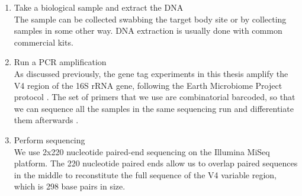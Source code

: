 \begin{enumerate}
\item Take a biological sample and extract the DNA\\
The sample can be collected swabbing the target body site or by collecting samples in some other way. DNA extraction is usually done with common commercial kits.

\item Run a PCR amplification\\
As discussed previously, the gene tag experiments in this thesis amplify the V4 region of the 16S rRNA gene, following the Earth Microbiome Project protocol \cite{caporaso2012ultra}. The set of primers that we use are combinatorial barcoded, so that we can sequence all the samples in the same sequencing run and differentiate them afterwards \cite{gloor2010microbiome}.

\item Perform sequencing\\
We use 2x220 nucleotide paired-end sequencing on the Illumina MiSeq platform. The 220 nucleotide paired ends allow us to overlap paired sequences in the middle to reconstitute the full sequence of the V4 variable region, which is 298 base pairs in size.
\end{enumerate}


